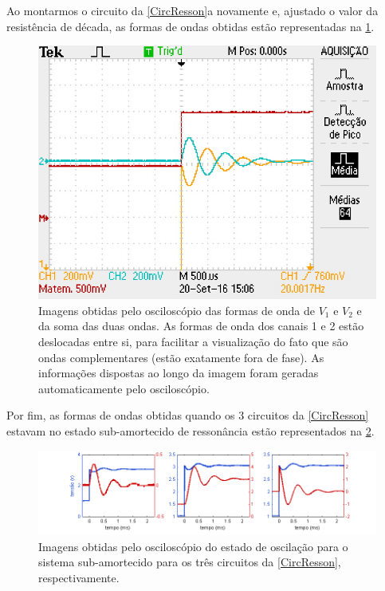 \documentclass[11pt,a4paper]{article}
\begin{document}
    Ao montarmos o circuito da \cref{CircResson}a novamente e, ajustado o valor da resistência de década, as formas de ondas obtidas estão representadas na \cref{SomaQuadrada}.
    
        \begin{figure}[!htb]
        \centering
        \includegraphics[scale=0.75]{SomaQuadrada.JPG}
        \caption{Imagens obtidas pelo osciloscópio das formas de onda de $V_1$ e $V_2$ e da soma das duas ondas. As formas de onda dos canais 1 e 2 estão deslocadas entre si, para facilitar a visualização do fato que são ondas complementares (estão exatamente fora de fase). As informações dispostas ao longo da imagem foram geradas automaticamente pelo osciloscópio.}
        \label{SomaQuadrada}
        \end{figure}
        
    Por fim, as formas de ondas obtidas quando os 3 circuitos da \cref{CircResson} estavam no estado sub-amortecido de ressonância estão representados na \cref{CircuitoTriplo}.
    
        \begin{figure}[!htb]
        \centering
        \includegraphics[scale=0.8]{CircuitoTriplo.png}
        \caption{Imagens obtidas pelo osciloscópio do estado de oscilação para o sistema sub-amortecido para os três circuitos da \cref{CircResson}, respectivamente.}
        \label{CircuitoTriplo}
        \end{figure}
\end{document}
